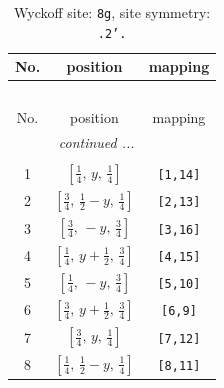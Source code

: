 \documentclass[fleqn,8pt]{jsarticle}
\begin{document}
\renewcommand{\arraystretch}{1.2}
\begin{longtable}{ccc}
\caption{Wyckoff site: {\tt 8g}, site symmetry: {\tt .2'.}}
 \\
 \hline \hline
No. & position & mapping \\ \hline \endfirsthead

\multicolumn{2}{l}{\tablename\ \thetable{}} \\
 \hline \hline
No. & position & mapping \\ \hline \endhead

 \hline \hline
\multicolumn{2}{r}{\footnotesize\it continued ...} \\ \endfoot

 \hline \hline
\multicolumn{2}{r}{} \\ \endlastfoot

1 & $\left[ \frac{1}{4},\, y,\, \frac{1}{4} \right]$ & {\tt [1,14]} \\ \hline
2 & $\left[ \frac{3}{4},\, \frac{1}{2} - y,\, \frac{1}{4} \right]$ & {\tt [2,13]} \\ \hline
3 & $\left[ \frac{3}{4},\, - y,\, \frac{3}{4} \right]$ & {\tt [3,16]} \\ \hline
4 & $\left[ \frac{1}{4},\, y + \frac{1}{2},\, \frac{3}{4} \right]$ & {\tt [4,15]} \\ \hline
5 & $\left[ \frac{1}{4},\, - y,\, \frac{3}{4} \right]$ & {\tt [5,10]} \\ \hline
6 & $\left[ \frac{3}{4},\, y + \frac{1}{2},\, \frac{3}{4} \right]$ & {\tt [6,9]} \\ \hline
7 & $\left[ \frac{3}{4},\, y,\, \frac{1}{4} \right]$ & {\tt [7,12]} \\ \hline
8 & $\left[ \frac{1}{4},\, \frac{1}{2} - y,\, \frac{1}{4} \right]$ & {\tt [8,11]} \\
\end{longtable}
\renewcommand{\arraystretch}{1.2}
\end{document}
